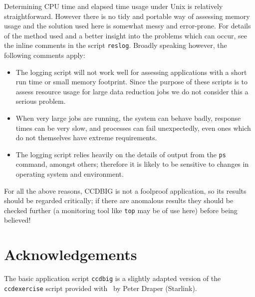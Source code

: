 Determining CPU time and elapsed time usage under Unix 
is relatively straightforward. 
However there is no tidy and portable way of
assessing memory usage and the solution used here is
somewhat messy and error-prone.
For details of the method used and a better insight into
the problems which can occur, see the inline comments in 
the script {\tt reslog}.
Broadly speaking however, the following comments apply:
\begin{itemize}
%
\item
The logging script will not work well for assessing applications
with a short run time or small memory footprint.  
Since the purpose of these scripts is to assess resource usage
for large data reduction jobs we do not consider this a serious problem.
%
\item
When very large jobs are running, 
the system can behave badly,
response times can be very slow,
and processes can fail unexpectedly, even ones which 
do not themselves have extreme requirements.
%
\item
The logging script relies heavily on the details of output from 
the {\tt ps} command, amongst others; therefore it is 
likely to be sensitive to changes in operating system and environment.
\end{itemize}
For all the above reasons, CCDBIG is not a foolproof application,
so its results should be regarded critically; 
if there are anomalous results they should be checked further 
(a monitoring tool like {\tt top} may be of use here)
before being believed!


\section{Acknowledgements}

The basic application script {\tt ccdbig}
is a slightly adapted version of the {\tt ccdexercise} script
provided with \CCDPref\ by Peter Draper (Starlink).





